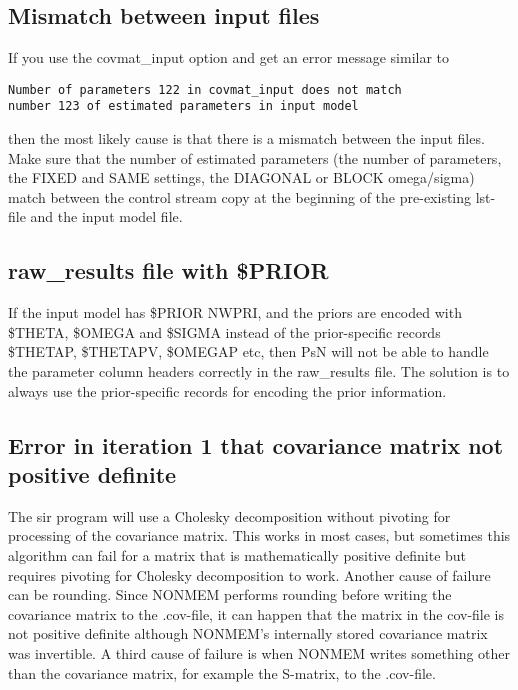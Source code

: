 \subsection*{Mismatch between input files}
If you use the covmat\_input option and get an error message similar to
\begin{verbatim}
Number of parameters 122 in covmat_input does not match 
number 123 of estimated parameters in input model
\end{verbatim}
then the most likely cause is that there is a mismatch between the input files. Make sure that the number of
estimated parameters (the number of parameters, the FIXED and SAME settings, the DIAGONAL or BLOCK omega/sigma)
match between the control stream copy at the beginning of the pre-existing lst-file and the input model file.
\subsection*{raw\_results file with \$PRIOR}
If the input model has \$PRIOR NWPRI, and the priors are encoded with \$THETA, \$OMEGA and \$SIGMA instead of the
prior-specific records \$THETAP, \$THETAPV, \$OMEGAP etc, then PsN will not be able to handle the parameter column
headers correctly in the raw\_results file. The solution is to always use the prior-specific records for
encoding the prior information.
\subsection*{Error in iteration 1 that covariance matrix not positive definite}
The sir program will use a Cholesky decomposition without pivoting for processing of the covariance matrix. 
This works in most cases, but sometimes this algorithm can fail for a matrix that is mathematically positive definite
but requires pivoting for Cholesky decomposition to work. Another cause of failure can be rounding. 
Since NONMEM performs rounding before writing 
the covariance matrix to the .cov-file, it can happen that the matrix in the cov-file is not positive definite
although NONMEM's internally stored covariance matrix was invertible. A third cause of failure
is when NONMEM writes something other than the covariance matrix, for example the S-matrix, to the .cov-file.

